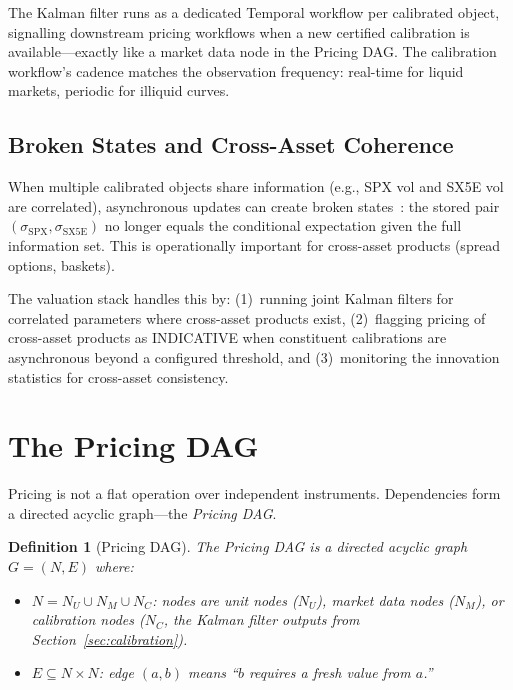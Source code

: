 \documentclass[11pt,a4paper]{article}
\newtheorem{definition}{Definition}[section]
\begin{document}
\noindent The Kalman filter runs as a dedicated Temporal workflow per calibrated object, signalling downstream pricing workflows when a new certified calibration is available---exactly like a market data node in the Pricing DAG.  The calibration workflow's cadence matches the observation frequency: real-time for liquid markets, periodic for illiquid curves.

\subsection{Broken States and Cross-Asset Coherence}

When multiple calibrated objects share information (e.g., SPX vol and SX5E vol are correlated), asynchronous updates can create broken states~\cite[\S7]{calibration_manifesto}: the stored pair $(\sigma_{\text{SPX}}, \sigma_{\text{SX5E}})$ no longer equals the conditional expectation given the full information set.  This is operationally important for cross-asset products (spread options, baskets).

The valuation stack handles this by: (1)~running joint Kalman filters for correlated parameters where cross-asset products exist, (2)~flagging pricing of cross-asset products as INDICATIVE when constituent calibrations are asynchronous beyond a configured threshold, and (3)~monitoring the innovation statistics for cross-asset consistency.

\clearpage
\section{The Pricing DAG}
\label{sec:pricing-dag}

Pricing is not a flat operation over independent instruments.  Dependencies form a directed acyclic graph---the \emph{Pricing DAG}.

\begin{definition}[Pricing DAG]
\label{def:pricing-dag}
The Pricing DAG is a directed acyclic graph $G = (N, E)$ where:
\begin{itemize}[nosep]
\item $N = N_U \cup N_M \cup N_C$: nodes are unit nodes ($N_U$), market data nodes ($N_M$), or calibration nodes ($N_C$, the Kalman filter outputs from Section~\ref{sec:calibration}).
\item $E \subseteq N \times N$: edge $(a, b)$ means ``$b$ requires a fresh value from $a$.''
\end{itemize}
\end{definition}
\end{document}
